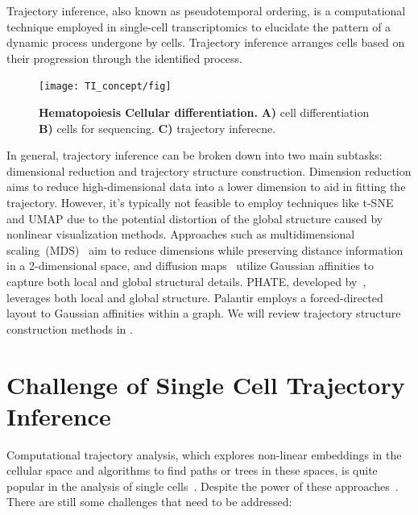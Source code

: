 Trajectory inference, also known as pseudotemporal ordering, is a computational technique employed in single-cell transcriptomics to elucidate the pattern of a dynamic process undergone by cells. Trajectory inference arranges cells based on their progression through the identified process. 

\begin{figure}[!h]
	\centering
	\texttt{[image: TI\_concept/fig]}
	\vspace{0.1cm}
	\caption[Hematopoiesis Cellular Differentiation]{\textbf{Hematopoiesis Cellular differentiation.} \textbf{A)} cell differentiation \textbf{B)} cells for sequencing. \textbf{C)} trajectory inferecne. }
	\label{fig:traj_concept}
\end{figure}

In general, trajectory inference can be broken down into two main subtasks: dimensional reduction and trajectory structure construction. Dimension reduction aims to reduce high-dimensional data into a lower dimension to aid in fitting the trajectory. However, it's typically not feasible to employ techniques like t-SNE and UMAP due to the potential distortion of the global structure caused by nonlinear visualization methods. Approaches such as multidimensional scaling~(MDS)~\citep{torgerson1952multidimensional} aim to reduce dimensions while preserving distance information in a 2-dimensional space, and diffusion maps~\citep{coifman2006diffusion} utilize Gaussian affinities to capture both local and global structural details. PHATE, developed by~\cite{moon2017phate}, leverages both local and global structure. Palantir employs a forced-directed layout to Gaussian affinities within a graph. We will review trajectory structure construction methods in .




\section{Challenge of Single Cell Trajectory Inference}
\label{bgTI:challenge_TI}
Computational trajectory analysis, which explores non-linear embeddings in the cellular space and algorithms to find paths or trees in these spaces, is quite popular in the analysis of single cells~\citep{wolf2019paga,chen2019stream,street2018slingshot,Lynch2022}. Despite the power of these approaches~\citep{saelens2019comparison}. There are still some challenges that need to be addressed:

